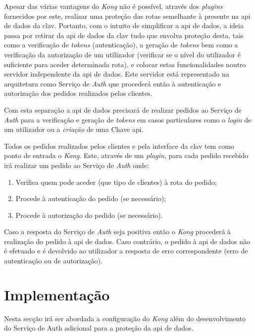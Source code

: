 Apesar das várias vantagens do \textit{Kong} não é possível, através dos \textit{plugins} fornecidos por este, 
realizar uma proteção das rotas semelhante à presente na \acrshort{api} de dados da \acrshort{clav}. 
Portanto, com o intuito de simplificar a \acrshort{api} de dados, a ideia passa por retirar da \acrshort{api} de 
dados da \acrshort{clav} tudo que envolva proteção desta, tais como a verificação de \textit{tokens} (autenticação), 
a geração de \textit{tokens} bem como a verificação da autorização de um utilizador (verificar se o nível do 
utilizador é suficiente para aceder determinada rota), e colocar estas funcionalidades noutro servidor 
independente da \acrshort{api} de dados. Este servidor está representado na arquitetura como Serviço de 
\textit{Auth} que procederá então à autenticação e autorização dos pedidos realizados pelos clientes.

Com esta separação a \acrshort{api} de dados precisará de realizar pedidos ao Serviço de \textit{Auth} para a 
verificação e geração de \textit{tokens} em casos particulares como o \textit{login} de um utilizador ou a 
\textit{criação} de uma Chave \acrshort{api}.

Todos os pedidos realizados pelos clientes e pela interface da \acrshort{clav} tem como ponto de entrada o 
\textit{Kong}. Este, através de um \textit{plugin}, para cada pedido recebido irá realizar um pedido ao Serviço 
de \textit{Auth} onde:

\begin{enumerate}
    \item Verifica quem pode aceder (que tipo de clientes) à rota do pedido;
    \item Procede à autenticação do pedido (se necessário);
    \item Procede à autorização do pedido (se necessário).
\end{enumerate}

Caso a resposta do Serviço de \textit{Auth} seja positiva então o \textit{Kong} procederá à realização do pedido 
à \acrshort{api} de dados. Caso contrário, o pedido à \acrshort{api} de dados não é efetuado e é devolvido ao 
utilizador a resposta de erro correspondente (erro de autenticação ou de autorização).

\section{Implementação}

Nesta secção irá ser abordada a configuração do \textit{Kong} além do desenvolvimento do Serviço de Auth adicional para a proteção da \acrshort{api} de dados.

